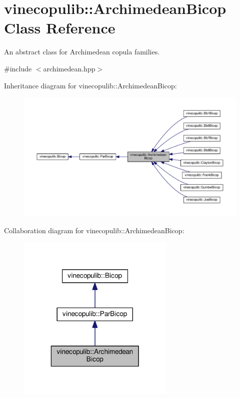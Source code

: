 \hypertarget{classvinecopulib_1_1_archimedean_bicop}{}\section{vinecopulib\+:\+:Archimedean\+Bicop Class Reference}
\label{classvinecopulib_1_1_archimedean_bicop}


An abstract class for Archimedean copula families.  




{\ttfamily \#include $<$archimedean.\+hpp$>$}



Inheritance diagram for vinecopulib\+:\+:Archimedean\+Bicop\+:\nopagebreak
\begin{figure}[H]
\begin{center}
\leavevmode
\includegraphics[width=350pt]{classvinecopulib_1_1_archimedean_bicop__inherit__graph}
\end{center}
\end{figure}


Collaboration diagram for vinecopulib\+:\+:Archimedean\+Bicop\+:\nopagebreak
\begin{figure}[H]
\begin{center}
\leavevmode
\includegraphics[width=213pt]{classvinecopulib_1_1_archimedean_bicop__coll__graph}
\end{center}
\end{figure}
